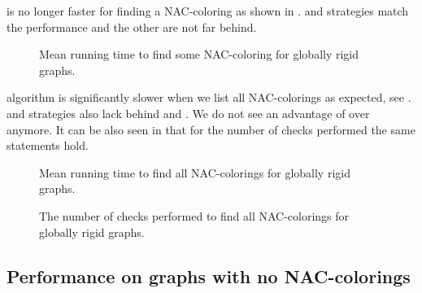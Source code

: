 \NaiveCycles{} is no longer faster for finding a NAC-coloring
as shown in .
\None{} and \Neighbors{} strategies match the performance and
the other are not far behind.
%
\begin{figure}[thbp]
	\centering
	\scalebox{\BenchFigureScale}{}
	\caption[Mean runtime for globally rigid graphs (some)]{
		Mean running time to find some NAC-coloring for globally rigid graphs.}%
	\label{fig:graph_globally_rigid_first_runtime}
\end{figure}%

\NaiveCycles{} algorithm is significantly slower when we list all NAC-colorings
as expected, see .
\None{} and \CycleMask{} strategies also lack behind \Neighbors{} and \NeighborsDegree{}.
We do not see an advantage of \MergeLinear{} over \SharedVertices{} anymore.
%
It can be also seen in 
that for the number of checks performed the same statements hold.
%
\begin{figure}[thbp]
	\centering
	\scalebox{\BenchFigureScale}{}
	\caption[Mean runtime for globally rigid graphs (all)]{
		Mean running time to find all NAC-colorings for globally rigid graphs.}%
	\label{fig:graph_globally_rigid_all_runtime}
\end{figure}%
\begin{figure}[thbp]
	\centering
	\scalebox{\BenchFigureScale}{}
	\caption[Checks performed for globally rigid graphs (all)]{
		The number of checks performed to find all NAC-colorings for globally rigid graphs.}%
	\label{fig:graph_globally_rigid_all_checks}
\end{figure}%



\subsection{Performance on graphs with no NAC-colorings}

